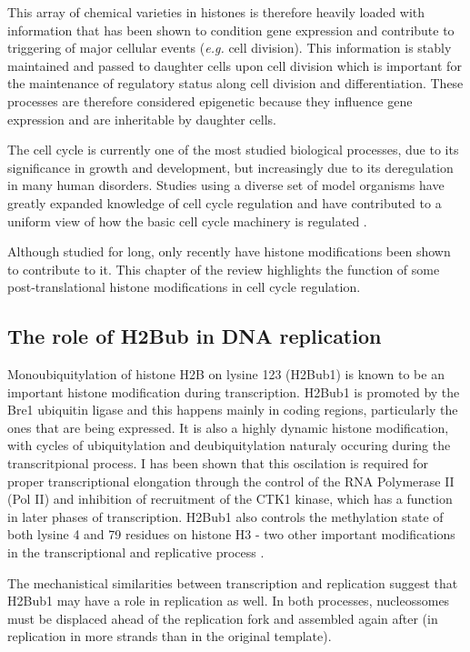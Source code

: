 \documentclass[11pt,twoside,a4paper]{report}
\begin{document}
	This array of chemical varieties in histones is therefore heavily loaded with information that has been shown to condition gene expression and contribute to triggering of major cellular events (\textit{e.g.} cell division). This information is stably maintained and passed to daughter cells upon cell division which is important for the maintenance of regulatory status along cell division and differentiation. These processes are therefore considered epigenetic because they influence gene expression and are inheritable by daughter cells.
		
	The cell cycle is currently one of the most studied biological processes, due to its significance in growth and development, but increasingly due to its deregulation in many human disorders. Studies using a diverse set of model organisms have greatly expanded knowledge of cell cycle regulation and have contributed to a uniform view of how the basic cell cycle machinery is regulated  \cite{Raynaud2014a}.
	
	Although studied for long, only recently have histone modifications been shown to contribute to it. This chapter of the review highlights the function of some post-translational histone modifications in cell cycle regulation.
		
		\subsection{The role of H2Bub in DNA replication}
		Monoubiquitylation of histone H2B on lysine 123 (H2Bub1) is known to be an important histone modification during transcription. H2Bub1 is promoted by the Bre1 ubiquitin ligase and this happens mainly in coding regions, particularly the ones that are being expressed. It is also a highly dynamic histone modification, with cycles of ubiquitylation and deubiquitylation naturaly occuring during the transcritpional process. I has been shown that this oscilation is required for proper transcriptional elongation through the control of the RNA Polymerase II (Pol II) and inhibition of recruitment of the CTK1 kinase, which has a function in later phases of transcription. H2Bub1 also controls the methylation state of both lysine 4 and 79 residues on histone H3 - two other important modifications in the transcriptional and replicative process \cite{Kouzarides2007}.
		
		The mechanistical similarities between transcription and replication suggest that H2Bub1 may have a role in replication as well. In both processes, nucleossomes must be displaced ahead of the replication fork and assembled again after (in replication in more strands than in the original template).
		
\end{document}
